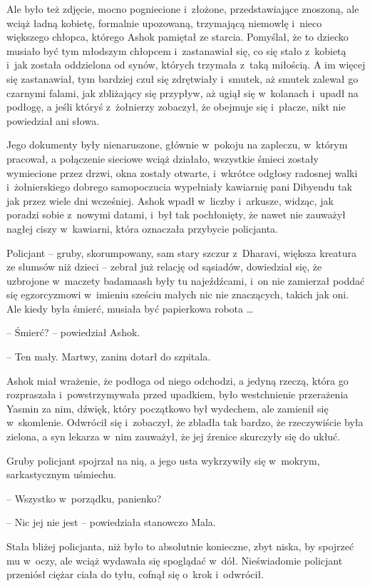 \documentclass[oneside,polish,11pt,rmheadings]{mwbk}
\begin{document}
Ale było też zdjęcie, mocno pogniecione i~złożone, przedstawiające znoszoną, ale wciąż ładną kobietę, formalnie upozowaną, trzymającą niemowlę i~nieco większego chłopca, którego Ashok pamiętał ze starcia. Pomyślał, że to dziecko musiało być tym młodszym chłopcem i~zastanawiał się, co się stało z~kobietą i~jak została oddzielona od synów, których trzymała z~taką miłością. A im więcej się zastanawiał, tym bardziej czuł się zdrętwiały i~smutek, aż smutek zalewał go czarnymi falami, jak zbliżający się przypływ, aż ugiął się w~kolanach i~upadł na podłogę, a jeśli któryś z~żołnierzy zobaczył, że obejmuje się i~płacze, nikt nie powiedział ani słowa.

Jego dokumenty były nienaruszone, głównie w~pokoju na zapleczu, w~którym pracował, a połączenie sieciowe wciąż działało, wszystkie śmieci zostały wymiecione przez drzwi, okna zostały otwarte, i~wkrótce odgłosy radosnej walki i~żołnierskiego dobrego samopoczucia wypełniały kawiarnię pani Dibyendu tak jak przez wiele dni wcześniej. Ashok wpadł w~liczby i~arkusze, widząc, jak poradzi sobie z~nowymi datami, i~był tak pochłonięty, że nawet nie zauważył nagłej ciszy w~kawiarni, która oznaczała przybycie policjanta.

Policjant -- gruby, skorumpowany, sam stary szczur z~Dharavi, większa kreatura ze slumsów niż dzieci -- zebrał już relację od sąsiadów, dowiedział się, że uzbrojone w~maczety badamaash były tu najeźdźcami, i~on nie zamierzał poddać się egzorcyzmowi w~imieniu sześciu małych nic nie znaczących, takich jak oni. Ale kiedy była śmierć, musiała być papierkowa robota \ldots 

-- Śmierć? -- powiedział Ashok.

-- Ten mały. Martwy, zanim dotarł do szpitala.

Ashok miał wrażenie, że podłoga od niego odchodzi, a jedyną rzeczą, która go rozpraszała i~powstrzymywała przed upadkiem, było westchnienie przerażenia Yasmin za nim, dźwięk, który początkowo był wydechem, ale zamienił się w~skomlenie. Odwrócił się i~zobaczył, że zbladła tak bardzo, że rzeczywiście była zielona, a syn lekarza w~nim zauważył, że jej źrenice skurczyły się do ukłuć.

Gruby policjant spojrzał na nią, a jego usta wykrzywiły się w~mokrym, sarkastycznym uśmiechu. 

-- Wszystko w~porządku, panienko?

-- Nic jej nie jest -- powiedziała stanowczo Mala. 

Stała bliżej policjanta, niż było to absolutnie konieczne, zbyt niska, by spojrzeć mu w~oczy, ale wciąż wydawała się spoglądać w~dół. Nieświadomie policjant przeniósł ciężar ciała do tyłu, cofnął się o~krok i~odwrócił.
\end{document}
